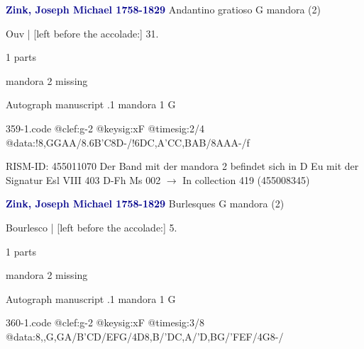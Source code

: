 \documentclass[twocolumn]{book}
\begin{document}
\newline \par \vspace{7pt} \textcolor{darkblue}{\textbf{Zink, Joseph Michael  1758-1829}}
\newline Andantino gratioso  G  
\newline mandora (2)
\newline \begin{itshape}[f.18v, at left:] Ouv | [left before the accolade:] 31.\end{itshape} 
\newline \textcolor{darkblue}{}  1 parts  
\newline \begin{small} mandora 2 missing\end{small} 
\newline Autograph manuscript
.1  mandora 1  G  
\begin{filecontents*}{359-1.code}
@clef:g-2
@keysig:xF
@timesig:2/4
@data:!8,GGAA/{8.6B'C}8D-/!{6DC}{,A'C}{C,B}{AB}/8AAA-/f
\end{filecontents*}
\newline
%

\newline RISM-ID: 455011070
\newline Der Band mit der mandora 2 befindet sich in D Eu mit der Signatur Esl VIII 403
\newline D-Fh  Ms 002
\newline $\rightarrow$ In collection 419 (455008345)

\newline \par \vspace{7pt} \textcolor{darkblue}{\textbf{Zink, Joseph Michael  1758-1829}}
\newline Burlesques  G  
\newline mandora (2)
\newline \begin{itshape}[f.8r, at left:] Bourlesco | [left before the accolade:] 5.\end{itshape} 
\newline \textcolor{darkblue}{}  1 parts  
\newline \begin{small} mandora 2 missing\end{small} 
\newline Autograph manuscript
.1  mandora 1  G  
\begin{filecontents*}{360-1.code}
@clef:g-2
@keysig:xF
@timesig:3/8
@data:8,,G,GA/B'CD/EFG/4D8,B/'DC,A/'D,BG/'FEF/4G8-/
\end{filecontents*}
\newline
%
\end{document}
